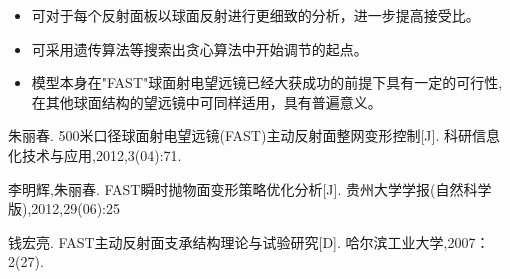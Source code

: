 \documentclass[withoutpreface,bwprint]{cumcmthesis} %
\begin{document}
\begin{itemize}
\item 可对于每个反射面板以球面反射进行更细致的分析，进一步提高接受比。
\item 可采用遗传算法等搜索出贪心算法中开始调节的起点。
\item 模型本身在"FAST"球面射电望远镜已经大获成功的前提下具有一定的可行性,
在其他球面结构的望远镜中可同样适用，具有普遍意义。
\end{itemize}



\newpage
    \begin{thebibliography}{9}%
        \bibitem [1] 
        \newblock 朱丽春.
        \newblock 500米口径球面射电望远镜(FAST)主动反射面整网变形控制[J].
        \newblock 科研信息化技术与应用,2012,3(04):71.

        \bibitem [2] 
        \newblock 李明辉,朱丽春.
        \newblock FAST瞬时抛物面变形策略优化分析[J].
        \newblock 贵州大学学报(自然科学版),2012,29(06):25

        \bibitem [3] 
        \newblock 钱宏亮.
        \newblock FAST主动反射面支承结构理论与试验研究[D].
        \newblock 哈尔滨工业大学,2007：2(27).
       


    \end{thebibliography}
\end{document}
